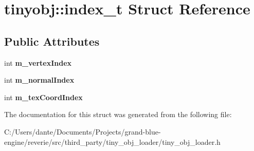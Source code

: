 \hypertarget{structtinyobj_1_1index__t}{}\section{tinyobj\+::index\+\_\+t Struct Reference}
\label{structtinyobj_1_1index__t}
\subsection*{Public Attributes}
\begin{DoxyCompactItemize}
\item 
\mbox{\label{structtinyobj_1_1index__t_ab6dab00005b3fa6a45633260c91582e9}} 
int {\bfseries m\+\_\+vertex\+Index}
\item 
\mbox{\label{structtinyobj_1_1index__t_ad85d488b8bb6322a40dee3c0f4df2c30}} 
int {\bfseries m\+\_\+normal\+Index}
\item 
\mbox{\label{structtinyobj_1_1index__t_ad1150d56c7b5ed43975baa667ef1321f}} 
int {\bfseries m\+\_\+tex\+Coord\+Index}
\end{DoxyCompactItemize}


The documentation for this struct was generated from the following file\+:\begin{DoxyCompactItemize}
\item 
C\+:/\+Users/dante/\+Documents/\+Projects/grand-\/blue-\/engine/reverie/src/third\+\_\+party/tiny\+\_\+obj\+\_\+loader/tiny\+\_\+obj\+\_\+loader.\+h\end{DoxyCompactItemize}
